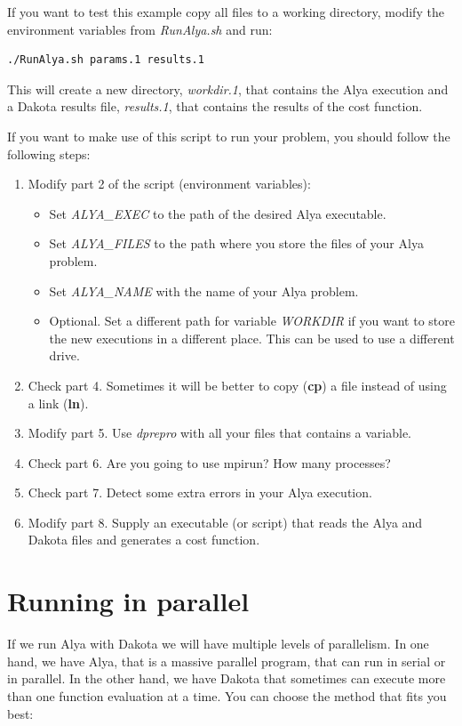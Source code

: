 \documentclass[12pt,a4paper,article]{memoir}
\begin{document}
If you want to test this example copy all files to a working directory, modify the environment variables from \textit{RunAlya.sh} and run:

\begin{lstlisting}[style=MyCodeStyle,language=bash]
./RunAlya.sh params.1 results.1
\end{lstlisting}

This will create a new directory, \textit{workdir.1}, that contains the Alya execution and a Dakota results file, \textit{results.1}, that contains the results of the cost function.

If you want to make use of this script to run your problem, you should follow the following steps:
\begin{enumerate}[label=Step \arabic*:,align=right,labelwidth=2.0cm,leftmargin=2.0cm]
\item Modify part 2 of the script (environment variables):
\begin{itemize}
\item Set \textit{ALYA\_EXEC} to the path of the desired Alya executable.
\item Set \textit{ALYA\_FILES} to the path where you store the files of your Alya problem.
\item Set \textit{ALYA\_NAME} with the name of your Alya problem.
\item Optional. Set a different path for variable \textit{WORKDIR} if you want to store the new executions in a different place. This can be used to use a different drive.
\end{itemize}
\item Check part 4. Sometimes it will be better to copy (\textbf{cp}) a file instead of using a link (\textbf{ln}).
\item Modify part 5. Use \textit{dprepro} with all your files that contains a variable.
\item Check part 6. Are you going to use mpirun? How many processes?
\item Check part 7. Detect some extra errors in your Alya execution.
\item Modify part 8. Supply an executable (or script) that reads the Alya and Dakota files and generates a cost function.
\end{enumerate}


\chapter{Running in parallel}
If we run Alya with Dakota we will have multiple levels of parallelism. In one hand, we have Alya, that is a massive parallel program, that can run in serial or in parallel. In the other hand, we have Dakota that sometimes can execute more than one function evaluation at a time. You can choose the method that fits you best:
\end{document}
